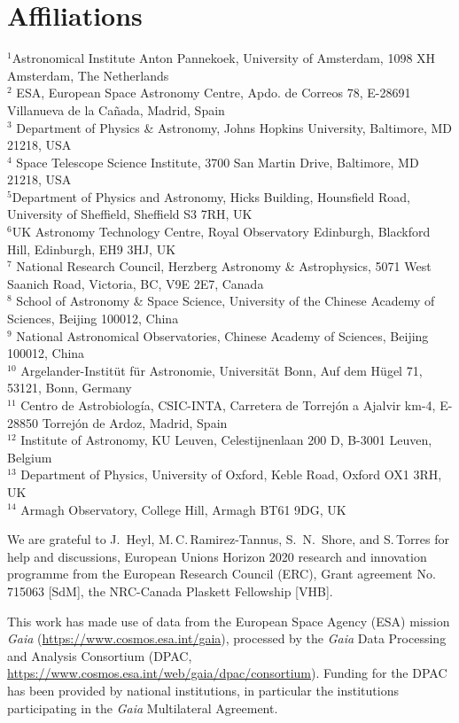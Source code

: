 \documentclass[apjl,twocolumn]{emulateapj}
\begin{document}
\section*{Affiliations}
\noindent $^{1}${Astronomical Institute Anton Pannekoek, University of
    Amsterdam, 1098 XH Amsterdam, The Netherlands} \\
  $^{2}$ {ESA, European Space Astronomy Centre, Apdo. de Correos 78,
    E-28691 Villanueva de la Ca\~nada, Madrid, Spain} \\
 $^{3}$ {
 Department of Physics \& Astronomy, Johns Hopkins University, Baltimore, MD 21218, USA}\\
  $^{4}$ {Space Telescope Science Institute, 3700 San Martin Drive,
    Baltimore, MD 21218, USA}\\
  $^{5}${Department of Physics and Astronomy, Hicks Building,
    Hounsfield Road, University of Sheffield, Sheffield S3 7RH, UK}\\
  $^{6}${UK Astronomy Technology Centre, Royal Observatory Edinburgh, Blackford Hill, Edinburgh, EH9 3HJ, UK}\\
  $^{7}$ {National Research Council, Herzberg Astronomy \&
    Astrophysics, 5071 West Saanich Road, Victoria, BC, V9E 2E7,
    Canada}\\
  $^{8}$ {School of Astronomy \& Space Science, University of the Chinese
    Academy of Sciences, Beijing 100012, China}\\
  $^{9}$ {National Astronomical Observatories, Chinese Academy of
    Sciences, Beijing 100012, China}\\
  $^{10}$ {Argelander-Instit\"ut f\"ur Astronomie, Universit\"at Bonn,
    Auf dem H\"ugel 71, 53121, Bonn, Germany}\\
  $^{11}$ {Centro de Astrobiología, CSIC-INTA, Carretera de Torrejón a Ajalvir km-4, E-28850 Torrejón de Ardoz, Madrid, Spain}\\
  $^{12}$ {Institute of Astronomy, KU Leuven, Celestijnenlaan 200 D, B-3001 Leuven, Belgium}\\
  $^{13}$ {Department of Physics, University of Oxford, Keble Road,
    Oxford OX1 3RH, UK} \\
  $^{14}$ {Armagh Observatory, College Hill, Armagh BT61 9DG, UK}\\

  

 \begin{acknowledgements}
   \small
   We are grateful to J.~Heyl, M.\,C.\,Ramirez-Tannus, S.~N.~Shore, and S.\,Torres
   for help and discussions, European Unions Horizon 2020 research and innovation programme from the European Research Council (ERC), Grant agreement No. 715063 [SdM], the NRC-Canada Plaskett Fellowship [VHB].
   
This work has made use of data from the European Space Agency (ESA) mission {\it Gaia} (\url{https://www.cosmos.esa.int/gaia}), processed by the {\it Gaia} Data Processing and Analysis Consortium (DPAC, \url{https://www.cosmos.esa.int/web/gaia/dpac/consortium}). Funding for the DPAC has been provided by national institutions, in particular the institutions
participating in the {\it Gaia} Multilateral Agreement. 
\end{acknowledgements}
\end{document}
